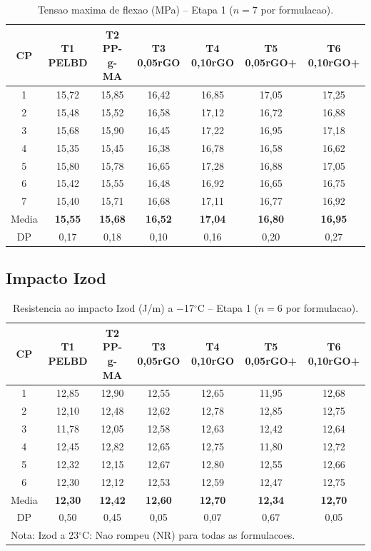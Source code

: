 \documentclass[11pt,a4paper]{article}
\begin{document}
\begin{table}[H]\centering
\caption{Tensao maxima de flexao (MPa) -- Etapa 1 ($n=7$ por formulacao).}\label{tab:tens1}
\begin{tabular}{ccccccc}
\toprule
{\bfseries CP} & {\bfseries T1 PELBD} & {\bfseries T2 PP-g-MA} & {\bfseries T3 0,05rGO} & {\bfseries T4 0,10rGO} & {\bfseries T5 0,05rGO+} & {\bfseries T6 0,10rGO+} \\
\midrule
1 & 15,72 & 15,85 & 16,42 & 16,85 & 17,05 & 17,25 \\
2 & 15,48 & 15,52 & 16,58 & 17,12 & 16,72 & 16,88 \\
3 & 15,68 & 15,90 & 16,45 & 17,22 & 16,95 & 17,18 \\
4 & 15,35 & 15,45 & 16,38 & 16,78 & 16,58 & 16,62 \\
5 & 15,80 & 15,78 & 16,65 & 17,28 & 16,88 & 17,05 \\
6 & 15,42 & 15,55 & 16,48 & 16,92 & 16,65 & 16,75 \\
7 & 15,40 & 15,71 & 16,68 & 17,11 & 16,77 & 16,92 \\
\midrule
Media & {\bfseries 15,55} & {\bfseries 15,68} & {\bfseries 16,52} & {\bfseries 17,04} & {\bfseries 16,80} & {\bfseries 16,95} \\
DP & 0,17 & 0,18 & 0,10 & 0,16 & 0,20 & 0,27 \\
\bottomrule
\end{tabular}
\end{table}

\subsection{Impacto Izod}

\begin{table}[H]\centering
\caption{Resistencia ao impacto Izod (J/m) a $-$17$^{\circ}$C -- Etapa 1 ($n=6$ por formulacao).}\label{tab:izod}
\begin{tabular}{ccccccc}
\toprule
{\bfseries CP} & {\bfseries T1 PELBD} & {\bfseries T2 PP-g-MA} & {\bfseries T3 0,05rGO} & {\bfseries T4 0,10rGO} & {\bfseries T5 0,05rGO+} & {\bfseries T6 0,10rGO+} \\
\midrule
1 & 12,85 & 12,90 & 12,55 & 12,65 & 11,95 & 12,68 \\
2 & 12,10 & 12,48 & 12,62 & 12,78 & 12,85 & 12,75 \\
3 & 11,78 & 12,05 & 12,58 & 12,63 & 12,42 & 12,64 \\
4 & 12,45 & 12,82 & 12,65 & 12,75 & 11,80 & 12,72 \\
5 & 12,32 & 12,15 & 12,67 & 12,80 & 12,55 & 12,66 \\
6 & 12,30 & 12,12 & 12,53 & 12,59 & 12,47 & 12,75 \\
\midrule
Media & {\bfseries 12,30} & {\bfseries 12,42} & {\bfseries 12,60} & {\bfseries 12,70} & {\bfseries 12,34} & {\bfseries 12,70} \\
DP & 0,50 & 0,45 & 0,05 & 0,07 & 0,67 & 0,05 \\
\bottomrule
\multicolumn{7}{l}{Nota: Izod a 23$^{\circ}$C: Nao rompeu (NR) para todas as formulacoes.} \\
\end{tabular}
\end{table}
\end{document}
